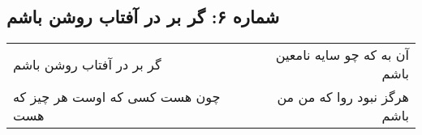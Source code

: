 \begin{center}
\section*{شماره ۶: گر بر در آفتاب روشن باشم}
\label{sec:006}
\begin{longtable}{l p{0.5cm} r}
گر بر در آفتاب روشن باشم
&&
آن به که چو سایه نامعین باشم
\\
چون هست کسی که اوست هر چیز که هست
&&
هرگز نبود روا که من من باشم
\\
\end{longtable}
\end{center}
